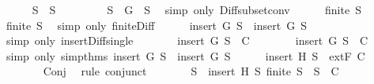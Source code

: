 \begin{isabellebody}
\ \ \ \ \isamarkupfalse%
\ {}{\isacharcolon}{\isachardoublequoteopen}{\isacharquery}S{}\ {\isasymsubseteq}\ S{\isachardoublequoteclose}\ \isanewline
\ \ \ \ \ \ \isamarkupfalse%
\ {\isacartoucheopen}S{}\ {\isasymsubseteq}\ {\isacharbraceleft}G{\isacharbraceright}\ {\isasymunion}\ S{\isacartoucheclose}\ \isamarkupfalse%
\ {\isacharparenleft}simp\ only{\isacharcolon}\ Diff{\isacharunderscore}subset{\isacharunderscore}conv{\isacharparenright}\isanewline
\ \ \ \ \isamarkupfalse%
\ {}{\isacharcolon}{\isachardoublequoteopen}finite\ {\isacharquery}S{}{\isachardoublequoteclose}\isanewline
\ \ \ \ \ \ \isamarkupfalse%
\ {\isacartoucheopen}finite\ S{}{\isacartoucheclose}\ \isamarkupfalse%
\ {\isacharparenleft}simp\ only{\isacharcolon}\ finite{\isacharunderscore}Diff{\isacharparenright}\isanewline
\ \ \ \ \isamarkupfalse%
\ {\isachardoublequoteopen}insert\ G\ {\isacharquery}S{}\ {\isacharequal}\ insert\ G\ S{}{\isachardoublequoteclose}\isanewline
\ \ \ \ \ \ \isamarkupfalse%
\ {\isacharparenleft}simp\ only{\isacharcolon}\ insert{\isacharunderscore}Diff{\isacharunderscore}single{\isacharparenright}\isanewline
\ \ \ \ \isamarkupfalse%
\ \isamarkupfalse%
\ {}{\isacharcolon}{\isachardoublequoteopen}insert\ G\ {\isacharquery}S{}\ {\isasymnotin}\ C{\isachardoublequoteclose}\isanewline
\ \ \ \ \ \ \isamarkupfalse%
\ {\isacartoucheopen}insert\ G\ S{}\ {\isasymnotin}\ C{\isacartoucheclose}\ \isamarkupfalse%
\ {\isacharparenleft}simp\ only{\isacharcolon}\ simp{\isacharunderscore}thms{\isacharparenleft}{}{\isacharcomma}{}{\isacharparenright}\ {\isacartoucheopen}insert\ G\ {\isacharquery}S{}\ {\isacharequal}\ insert\ G\ S{}{\isacartoucheclose}{\isacharparenright}\isanewline
\ \ \ \ \isamarkupfalse%
\ {\isachardoublequoteopen}insert\ H\ S\ {\isasymnotin}\ {\isacharparenleft}extF\ C{\isacharparenright}{\isachardoublequoteclose}\isanewline
\ \ \ \ \ \ \isamarkupfalse%
\ Conj\ \isamarkupfalse%
\ {\isacharparenleft}rule\ conjunct{}{\isacharparenright}\isanewline
\ \ \ \ \isamarkupfalse%
\ \isamarkupfalse%
\ {\isachardoublequoteopen}{\isasymnot}{\isacharparenleft}{\isasymforall}S{\isacharprime}\ {\isasymsubseteq}\ {\isacharparenleft}insert\ H\ S{\isacharparenright}{\isachardot}\ finite\ S{\isacharprime}\ {\isasymlongrightarrow}\ S{\isacharprime}\ {\isasymin}\ C{\isacharparenright}{\isachardoublequoteclose}\isanewline

\end{isabellebody}
